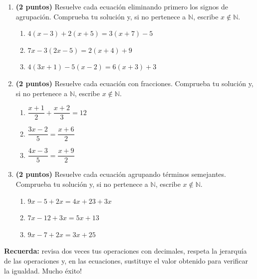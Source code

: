 \documentclass[12pt, letterpaper]{article}
\newcommand{\N}{\mathbb{N}}
\begin{document}
\begin{enumerate}[leftmargin=*, resume]

  \item \textbf{(2 puntos)} Resuelve cada ecuación eliminando primero los signos de agrupación. Comprueba tu solución y, si no pertenece a $\N$, escribe $x \notin \N$.
        \begin{enumerate}[label=\alph*), leftmargin=*]
          \item $4(x - 3) + 2(x + 5) = 3(x + 7) - 5$
          \item $7x - 3(2x - 5) = 2(x + 4) + 9$
          \item $4(3x + 1) - 5(x - 2) = 6(x + 3) + 3$
        \end{enumerate}

  \item \textbf{(2 puntos)} Resuelve cada ecuación con fracciones. Comprueba tu solución y, si no pertenece a $\N$, escribe $x \notin \N$.
        \begin{enumerate}[label=\alph*), leftmargin=*]
          \item $\dfrac{x + 1}{2} + \dfrac{x + 2}{3} = 12$
          \item $\dfrac{3x - 2}{5} = \dfrac{x + 6}{2}$
          \item $\dfrac{4x - 3}{5} = \dfrac{x + 9}{2}$
        \end{enumerate}

  \item \textbf{(2 puntos)} Resuelve cada ecuación agrupando términos semejantes. Comprueba tu solución y, si no pertenece a $\N$, escribe $x \notin \N$.
        \begin{enumerate}[label=\alph*), leftmargin=*]
          \item $9x - 5 + 2x = 4x + 23 + 3x$
          \item $7x - 12 + 3x = 5x + 13$
          \item $9x - 7 + 2x = 3x + 25$
        \end{enumerate}

\end{enumerate}

\vspace{10pt}
\begin{cuadroinfo}
  \small
  \textbf{Recuerda:} revisa dos veces tus operaciones con decimales, respeta la jerarquía de las operaciones y, en las ecuaciones, sustituye el valor obtenido para verificar la igualdad. \textquestiondown Mucho éxito!
\end{cuadroinfo}
\end{document}
